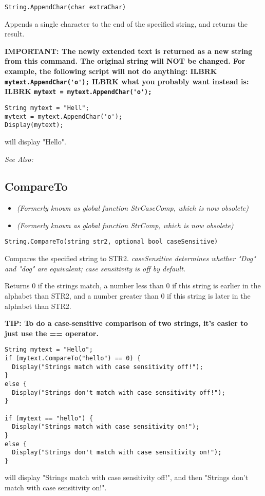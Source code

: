 \begin{verbatim}
String.AppendChar(char extraChar)
\end{verbatim}
Appends a single character to the end of the specified string, and returns the result.

\bf{IMPORTANT:} The newly extended text is returned as a new string from this command.
The original string will \bf{NOT} be changed. For
example, the following script will not do anything: ILBRK
\verb$mytext.AppendChar('o');$ ILBRK
what you probably want instead is: ILBRK
\verb$mytext = mytext.AppendChar('o');$

\begin{verbatim}
String mytext = "Hell";
mytext = mytext.AppendChar('o');
Display(mytext);
\end{verbatim}
will display "Hello".

\it{See Also:} 


\subsection{CompareTo}\label{String.CompareTo}%

\begin{itemize}
\item \it{(Formerly known as global function StrCaseComp, which is now obsolete)}
\item \it{(Formerly known as global function StrComp, which is now obsolete)}
\end{itemize}

\begin{verbatim}
String.CompareTo(string str2, optional bool caseSensitive)
\end{verbatim}
Compares the specified string to STR2. \it{caseSensitive} determines whether "Dog" and "dog"
are equivalent; case sensitivity is off by default.

Returns 0 if the strings match, a number less than 0 if this string is earlier in the alphabet than STR2,
and a number greater than 0 if this string is later in the alphabet than STR2.

\bf{TIP:} To do a case-sensitive comparison of two strings, it's easier to just use the == operator.

\begin{verbatim}
String mytext = "Hello";
if (mytext.CompareTo("hello") == 0) {
  Display("Strings match with case sensitivity off!");
}
else {
  Display("Strings don't match with case sensitivity off!");
}

if (mytext == "hello") {
  Display("Strings match with case sensitivity on!");
}
else {
  Display("Strings don't match with case sensitivity on!");
}
\end{verbatim}
will display "Strings match with case sensitivity off!", and then "Strings don't match with case sensitivity on!".


